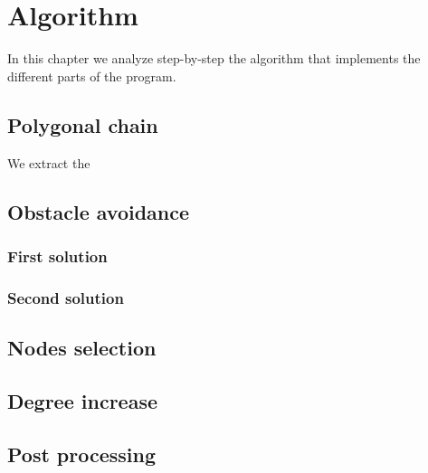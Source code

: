 \documentclass[dissertation.tex]{subfiles}
\begin{document}
\chapter{Algorithm}
In this chapter we analyze step-by-step the algorithm that implements
the different parts of the program. 
\section{Polygonal chain}
We extract the 
\section{Obstacle avoidance}
\subsection{First solution}
\subsection{Second solution}
\section{Nodes selection}
\section{Degree increase}
\section{Post processing}
\end{document}
